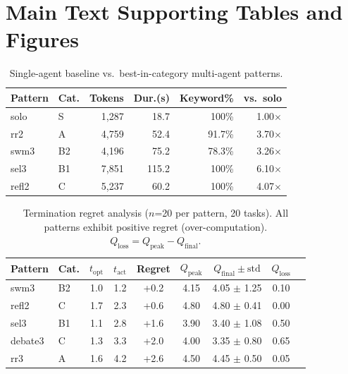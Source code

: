 \documentclass{article}
\begin{document}
\section{Main Text Supporting Tables and Figures}
\label{app:supporting}

\begin{table}[H]
\centering
\caption{Single-agent baseline vs.\ best-in-category multi-agent patterns.}
\label{tab:solo_baseline}
{\small
\begin{tabular}{@{}llrrrr@{}}
\toprule
\textbf{Pattern} & \textbf{Cat.} & \textbf{Tokens} & \textbf{Dur.(s)} & \textbf{Keyword\%} & \textbf{vs.\ solo} \\
\midrule
solo & S & 1,287 & 18.7 & 100\% & 1.00$\times$ \\
rr2 & A & 4,759 & 52.4 & 91.7\% & 3.70$\times$ \\
swm3 & B2 & 4,196 & 75.2 & 78.3\% & 3.26$\times$ \\
sel3 & B1 & 7,851 & 115.2 & 100\% & 6.10$\times$ \\
refl2 & C & 5,237 & 60.2 & 100\% & 4.07$\times$ \\
\bottomrule
\end{tabular}
}
\end{table}

\begin{table}[H]
\centering
\caption{Termination regret analysis ($n$=20 per pattern, 20 tasks). All patterns exhibit positive regret (over-computation). $Q_{\text{loss}} = Q_{\text{peak}} - Q_{\text{final}}$.}
\label{tab:regret}
{\small
\begin{tabular}{@{}llccccccc@{}}
\toprule
\textbf{Pattern} & \textbf{Cat.} & $t_{\text{opt}}$ & $t_{\text{act}}$ & \textbf{Regret} & $Q_{\text{peak}}$ & $Q_{\text{final}} \pm \text{std}$ & $Q_{\text{loss}}$ \\
\midrule
swm3 & B2 & 1.0 & 1.2 & +0.2 & 4.15 & 4.05 $\pm$ 1.25 & 0.10 \\
refl2 & C & 1.7 & 2.3 & +0.6 & 4.80 & 4.80 $\pm$ 0.41 & 0.00 \\
sel3 & B1 & 1.1 & 2.8 & +1.6 & 3.90 & 3.40 $\pm$ 1.08 & 0.50 \\
debate3 & C & 1.3 & 3.3 & +2.0 & 4.00 & 3.35 $\pm$ 0.80 & 0.65 \\
rr3 & A & 1.6 & 4.2 & +2.6 & 4.50 & 4.45 $\pm$ 0.50 & 0.05 \\
\bottomrule
\end{tabular}
}
\end{table}
\end{document}

